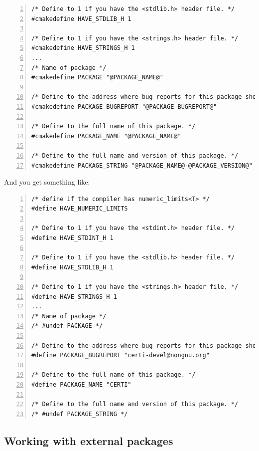 \documentclass[compress,slidestop,table
              ]
               {beamer}
\newcommand{\fname}[1]{\texttt{#1}}
\begin{document}
\begin{frame}
\begin{Verbatim}[fontsize=\tiny,numbers=left,frame=topline,label=Excerpt from CERTI \fname{config.h.cmake}]
/* Define to 1 if you have the <stdlib.h> header file. */
#cmakedefine HAVE_STDLIB_H 1

/* Define to 1 if you have the <strings.h> header file. */
#cmakedefine HAVE_STRINGS_H 1
...
/* Name of package */
#cmakedefine PACKAGE "@PACKAGE_NAME@"

/* Define to the address where bug reports for this package should be sent. */
#cmakedefine PACKAGE_BUGREPORT "@PACKAGE_BUGREPORT@"

/* Define to the full name of this package. */
#cmakedefine PACKAGE_NAME "@PACKAGE_NAME@"

/* Define to the full name and version of this package. */
#cmakedefine PACKAGE_STRING "@PACKAGE_NAME@-@PACKAGE_VERSION@"
\end{Verbatim}

And you get something like:
\begin{Verbatim}[fontsize=\tiny,numbers=left,frame=topline,label=Excerpt from generated CERTI \fname{config.h}]
/* define if the compiler has numeric_limits<T> */
#define HAVE_NUMERIC_LIMITS

/* Define to 1 if you have the <stdint.h> header file. */
#define HAVE_STDINT_H 1

/* Define to 1 if you have the <stdlib.h> header file. */
#define HAVE_STDLIB_H 1

/* Define to 1 if you have the <strings.h> header file. */
#define HAVE_STRINGS_H 1
...
/* Name of package */
/* #undef PACKAGE */

/* Define to the address where bug reports for this package should be sent. */
#define PACKAGE_BUGREPORT "certi-devel@nongnu.org"

/* Define to the full name of this package. */
#define PACKAGE_NAME "CERTI"

/* Define to the full name and version of this package. */
/* #undef PACKAGE_STRING */
\end{Verbatim}
\end{frame}

\subsection{Working with external packages}
\end{document}
